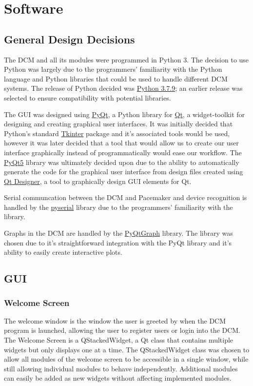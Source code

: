 \documentclass[12pt]{article}
\begin{document}
\newpage
\section{Software}
\subsection{General Design Decisions}
The DCM and all its modules were programmed in Python 3. The decision to use Python was largely due to the programmers' familiarity with the Python language and Python libraries that could be used to handle different DCM systems. The release of Python decided was \href{https://www.python.org/downloads/release/python-379/}{Python 3.7.9}; an earlier release was selected to ensure compatibility with potential libraries.

The GUI was designed using \href{https://riverbankcomputing.com/software/pyqt/intro}{PyQt}, a Python library for \href{https://www.qt.io/}{Qt}, a widget-toolkit for designing and creating graphical user interfaces. It was initially decided that Python's standard \href{https://docs.python.org/3/library/tkinter.html}{Tkinter} package and it's associated tools would be used, however it was later decided that a tool that would allow us to create our user interface graphically instead of programmatically would ease our workflow. The \href{https://pypi.org/project/PyQt5/}{PyQt5} library was ultimately decided upon due to the ability to automatically generate the code for the graphical user interface from design files created using \href{https://doc.qt.io/qt-5/qtdesigner-manual.html}{Qt Designer}, a tool to graphically design GUI elements for Qt.

Serial communcation between the DCM and Pacemaker and device recognition is handled by the \href{https://pypi.org/project/pyserial/}{pyserial} library due to the programmers' familiarity with the library.

Graphs in the DCM are handled by the \href{http://www.pyqtgraph.org/}{PyQtGraph} library. The library was chosen due to it's straightforward integration with the PyQt library and it's ability to easily create interactive plots.

\subsection{GUI}
\subsubsection{Welcome Screen}
The welcome window is the window the user is greeted by when the DCM program is launched, allowing the user to register users or login into the DCM. The Welcome Screen is a QStackedWidget, a Qt class that contains multiple widgets but only displays one at a time. The QStackedWidget class was chosen to allow all modules of the welcome screen to be accessible in a single window, while still allowing individual modules to behave independently. Additional modules can easily be added as new widgets without affecting implemented modules.
\end{document}

